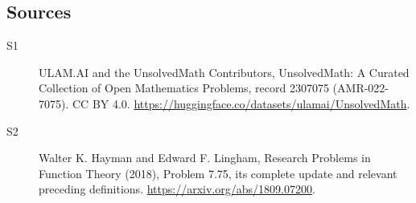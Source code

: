 \documentclass[11pt]{article}
\begin{document}
\subsection{Sources}
\begin{description}
\item[\hypertarget{source:2307075:1}{S1}] ULAM.AI and the UnsolvedMath Contributors, UnsolvedMath: A Curated Collection of Open Mathematics Problems, record 2307075 (AMR-022-7075). CC BY 4.0. \url{https://huggingface.co/datasets/ulamai/UnsolvedMath}.
\item[\hypertarget{source:2307075:2}{S2}] Walter K. Hayman and Edward F. Lingham, Research Problems in Function Theory (2018), Problem 7.75, its complete update and relevant preceding definitions. \url{https://arxiv.org/abs/1809.07200}.
\end{description}
\label{end:2307075}
\end{document}
